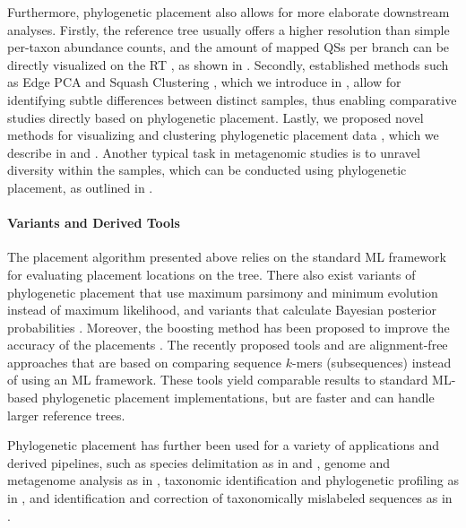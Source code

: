 Furthermore, phylogenetic placement also allows for more elaborate downstream analyses.
Firstly, the reference tree usually offers a higher resolution than simple per-taxon abundance counts,
and the amount of mapped \acp{QS} per branch can be directly visualized on the \ac{RT} \citep{Mahe2017},
as shown in .
Secondly, established methods such as Edge PCA and Squash Clustering \citep{Matsen2011a},
which we introduce in ,
allow for identifying subtle differences between distinct samples,
thus enabling comparative studies directly based on phylogenetic placement.
Lastly, we proposed novel methods for visualizing and clustering phylogenetic placement data \citep{Czech2019-analysis},
which we describe in  and .
Another typical task in metagenomic studies is to unravel diversity within the samples,
which can be conducted using phylogenetic placement, as outlined in .

\paragraph{Variants and Derived Tools}
\label{ch:Foundations:sec:PhylogeneticPlacement:sub:UseCasesApplications:par:DerivedTools}

The placement algorithm presented above relies on the standard ML framework for evaluating placement locations on the tree.
There also exist variants of phylogenetic placement that use maximum parsimony \cite{Berger2011}
and minimum evolution \cite{Filipski2015} instead of maximum likelihood,
and variants that calculate Bayesian posterior probabilities \cite{Matsen2010}.
Moreover, the boosting method  has been proposed to improve the accuracy of the placements \cite{Mirarab2012}.
The recently proposed tools  \cite{Linard2018} and  \cite{Balaban2018}
are alignment-free approaches that are based on comparing sequence $k$-mers (subsequences) instead of using an ML framework.
These tools yield comparable results to standard ML-based phylogenetic placement implementations,
but are faster and can handle larger reference trees.

Phylogenetic placement has further been used for a variety of applications and derived pipelines, such as
species delimitation as in  \cite{Zhang2013} and  \cite{Kapli2017},
genome and metagenome analysis as in  \cite{Darling2014},
taxonomic identification and phylogenetic profiling as in  \cite{Nguyen2014}, and
identification and correction of taxonomically mislabeled sequences as in  \cite{Kozlov2016}.

